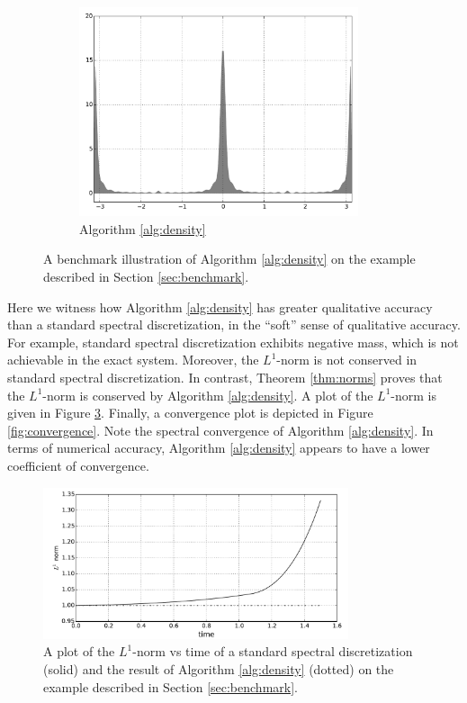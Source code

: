 \documentclass[final,leqno]{siamart}
\begin{document}
\begin{figure}[h!]
\begin{subfigure}{0.36\textwidth}
		\includegraphics[width=0.9\textwidth]{./images/gn_spectral_1D.pdf}
		\caption{Algorithm \ref{alg:density}}
		\label{fig:gn spectral}
	\end{subfigure}
	\caption{A benchmark illustration of Algorithm \ref{alg:density} on the example described in Section \ref{sec:benchmark}.}
	\label{fig:S1}
\end{figure}

Here we witness how Algorithm \ref{alg:density} has greater qualitative accuracy than a standard spectral discretization, in the ``soft'' sense of qualitative accuracy.
For example, standard spectral discretization exhibits negative mass, which is not achievable in the exact system.
Moreover, the $L^{1}$-norm is not conserved in standard spectral discretization.  
In contrast, Theorem \ref{thm:norms} proves that the $L^{1}$-norm is conserved by Algorithm \ref{alg:density}.
A plot of the $L^{1}$-norm is given in Figure \ref{fig:L1}.
Finally, a convergence plot is depicted in Figure \ref{fig:convergence}.  
Note the spectral convergence of Algorithm \ref{alg:density}.
In terms of numerical accuracy, Algorithm \ref{alg:density} appears to have a lower coefficient of convergence.

\begin{figure}[h!]
	\hspace*{-1.2cm}
	\centering
	\includegraphics[width=0.8\textwidth]{./images/L1_plot.pdf}
	\caption{A plot of the $L^{1}$-norm vs time of a standard spectral discretization (solid) and the result of Algorithm \ref{alg:density} (dotted) on the example described in Section \ref{sec:benchmark}.}
	\label{fig:L1}
\end{figure}
\end{document}
